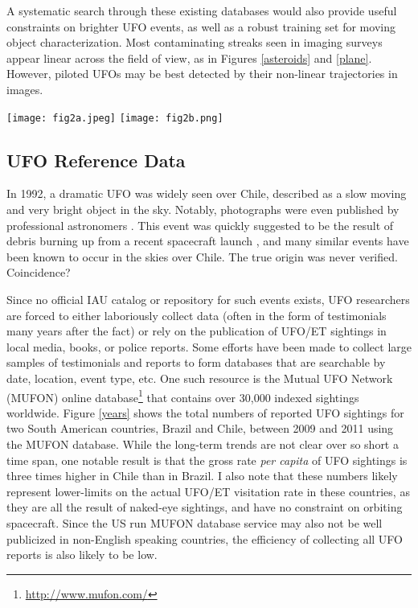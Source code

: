 \documentclass[iop]{emulateapj}
\begin{document}
A systematic search through these existing databases would also provide useful constraints on brighter UFO events, as well as a robust training set for moving object characterization. Most contaminating streaks seen in imaging surveys appear linear across the field of view, as in Figures \ref{asteroids} and \ref{plane}. However, piloted UFOs may be best detected by their non-linear trajectories in images.


\begin{figure*}[!ht]
\centering
\texttt{[image: fig2a.jpeg]} \hspace{0.1in}
\texttt{[image: fig2b.png]}
\caption{Left: A dramatic image artifact in the SDSS DR6, possibly an airplane, noted by users of the GalaxyZoo program. Right: A verified airplane imaged by the MACHO project.}
\label{plane}
\end{figure*}



\subsection{UFO Reference Data}

In 1992, a dramatic UFO was widely seen over Chile, described as a slow moving and very bright object in the sky. Notably, photographs were even published by professional astronomers \citep{1992Msngr..67...56H}. This event was quickly suggested to be the result of debris burning up from a recent spacecraft launch \citep{1992Msngr..68...42B}, and many similar events have been known to occur in the skies over Chile. The true origin was never verified. Coincidence?

Since no official IAU catalog or repository for such events exists, UFO researchers are forced to either laboriously collect data (often in the form of testimonials many years after the fact) or rely on the publication of UFO/ET sightings in local media, books, or police reports. Some efforts have been made to collect large samples of testimonials and reports to form databases that are searchable by date, location, event type, etc. One such resource is the Mutual UFO Network (MUFON) online database\footnote{\url{http://www.mufon.com/}} that contains over 30,000 indexed sightings worldwide. Figure \ref{years} shows the total numbers of reported UFO sightings for two South American countries, Brazil and Chile, between 2009 and 2011 using the MUFON database. While the long-term trends are not clear over so short a time span, one notable result is that the gross rate {\it per capita} of UFO sightings is three times higher in Chile than in Brazil. I also note that  these numbers likely represent lower-limits on the actual UFO/ET visitation rate in these countries, as they are all the result of naked-eye sightings, and have no constraint on orbiting spacecraft. Since the US run MUFON database service may also not be  well publicized in non-English speaking countries, the efficiency of collecting all UFO reports is also likely to be low. 
\end{document}
